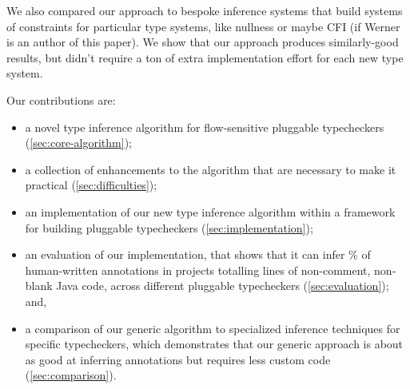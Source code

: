 We also compared our approach to bespoke inference systems that build
systems of constraints for particular type systems, like nullness or
maybe CFI (if Werner is an author of this paper). We show that our approach
produces similarly-good results, but didn't require a ton of extra
implementation effort for each new type system.

Our contributions are:
\begin{itemize}
\item a novel type inference algorithm for flow-sensitive pluggable
  typecheckers (\cref{sec:core-algorithm});
\item a collection of enhancements to the algorithm that are necessary to
  make it practical (\cref{sec:difficulties});
\item an implementation of our new type inference algorithm within a framework
  for building pluggable typecheckers (\cref{sec:implementation});
\item an evaluation of our implementation, that shows that it can infer
  \% of human-written annotations in  projects totalling
   lines of non-comment, non-blank Java code, across  different
  pluggable typecheckers (\cref{sec:evaluation}); and,
\item a comparison of our generic algorithm to specialized inference
  techniques for specific typecheckers, which demonstrates that our generic
  approach is about as good at inferring annotations but requires less
  custom code (\cref{sec:comparison}).
\end{itemize}
